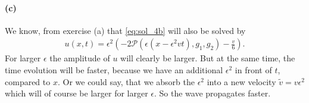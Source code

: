 \paragraph{(c)}
We know, from exercise (a) that \cref{eq:sol_4b} will also be solved by
\begin{align}
u(x,t)=\epsilon^2\left(-2\mathscr{P}(\epsilon\left( x-\epsilon^2v t\right), g_1,g_2)-\frac{v}{6}\right).
\end{align}
For larger $\epsilon$ the amplitude of $u$ will clearly be larger. But at the same time, the time evolution will be faster, because we have an additional $\epsilon^2$ in front of $t$, compared to $x$. Or we could say, that we absorb the $\epsilon^2$ into a new velocity $\tilde{v}=v\epsilon^2$ which will of course be larger for larger $\epsilon$. So the wave propagates faster. 